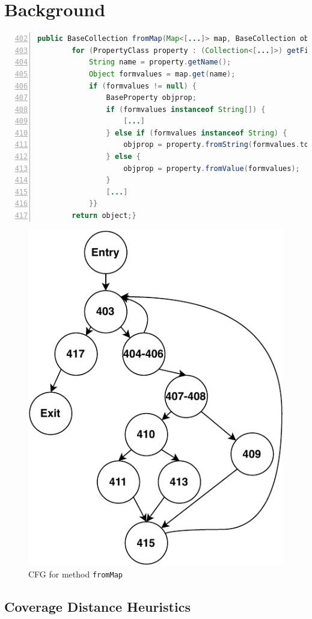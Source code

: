 \section{Background}
\label{section:bbc:background}

\begin{lstlisting}[frame=tb,
    caption={Method \texttt{fromMap} from XWIKI version 8.1 (collected in Chapter \ref{sec:jcrashpack:introduction})},
    label=list:fromMap,
    language=java,
    captionpos=t,
    numbers=left,
    basicstyle=\tiny,
    belowskip=-2.5em,
    float=t,
    firstnumber=402]
    public BaseCollection fromMap(Map<[...]> map, BaseCollection object){
        for (PropertyClass property : (Collection<[...]>) getFieldList()) {
            String name = property.getName();
            Object formvalues = map.get(name);
            if (formvalues != null) {
                BaseProperty objprop;
                if (formvalues instanceof String[]) {
                    [...]
                } else if (formvalues instanceof String) {
                    objprop = property.fromString(formvalues.toString());
                } else {
                    objprop = property.fromValue(formvalues);
                }
                [...]
            }}
        return object;}
  \end{lstlisting}
 
  \begin{figure}[t]
    \centering
    \includegraphics[width=0.35\linewidth]{papers/bbc/figures/fromMapCFG}
    
    \caption{CFG for method \texttt{fromMap}}
  \label{fig:CFG}
  \vspace{-2em}
\end{figure}

\subsection{Coverage Distance Heuristics}
\label{section:background:distance}

